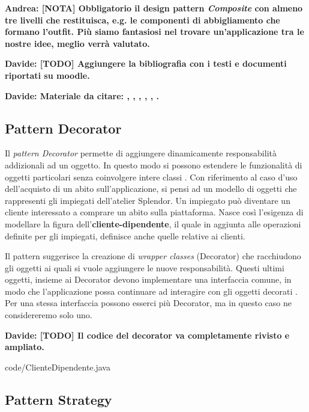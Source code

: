 \documentclass[12pt]{article}
\newcommand{\andrea}[1]{{\bf \color{mauve} Andrea: #1 }}
\newcommand{\davide}[1]{{\bf \color{chromeyellow} Davide: #1 }}
\begin{document}
\andrea{\textbf{[NOTA]} Obbligatorio il design pattern {\em Composite} con almeno tre livelli che restituisca, e.g. le componenti di abbigliamento che formano l'outfit. Più siamo fantasiosi nel trovare un'applicazione tra le nostre idee, meglio verrà valutato.}

\davide{\textbf{[TODO]} Aggiungere la bibliografia con i testi e documenti riportati su moodle.}

\davide{Materiale da citare: \cite{gof_riferimento}, \cite{up-riferimento}, \cite{uml_riferimento}, \cite{elicitation_tools}, \cite{gof_sunt}, \cite{github}.}


\subsection{Pattern Decorator}

Il {\em pattern Decorator} permette di aggiungere dinamicamente responsabilità addizionali ad un oggetto. In questo modo si possono estendere le funzionalità di oggetti particolari senza coinvolgere intere classi \cite{gof_sunt}.
Con riferimento al caso d'uso dell'acquisto di un abito sull'applicazione, si pensi ad un modello di oggetti che rappresenti gli impiegati dell'atelier Splendor. Un impiegato può diventare un cliente interessato a comprare un abito sulla piattaforma. Nasce così l'esigenza di modellare la figura dell'\textbf{cliente-dipendente}, il quale in aggiunta alle operazioni definite per gli impiegati, definisce anche quelle relative ai clienti.

Il pattern suggerisce la creazione di {\em wrapper classes} (Decorator) che racchiudono gli oggetti ai quali si vuole aggiungere le nuove responsabilità. Questi ultimi oggetti, insieme ai Decorator devono implementare una interfaccia comune, in modo che l’applicazione possa continuare ad interagire con gli oggetti decorati \cite{gof_sunt}.
Per una stessa interfaccia possono esserci più Decorator, ma in questo caso ne considereremo solo uno.

\davide{\textbf{[TODO]} Il codice del decorator va completamente rivisto e ampliato.}


{code/ClienteDipendente.java}


\subsection{Pattern Strategy}
\end{document}
